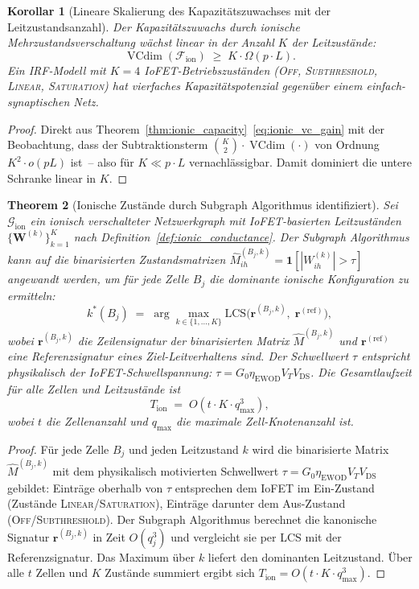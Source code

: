 \documentclass[12pt, a4paper, openany]{report}
\newtheorem{theorem}{Theorem}[chapter]
\newtheorem{corollary}[theorem]{Korollar}
\newcommand{\calG}{\mathcal{G}}
\newcommand{\calF}{\mathcal{F}}
\DeclareMathOperator{\VC}{VCdim}
\begin{document}
\begin{corollary}[Lineare Skalierung des Kapazitätszuwachses mit der Leitzustandsanzahl]
\label{cor:ionic_linear}
Der Kapazitätszuwachs durch ionische Mehrzustandsverschaltung wächst
linear in der Anzahl $K$ der Leitzustände:
\[
  \VC(\calF_{\mathrm{ion}}) \;\geq\; K \cdot \Omega(p \cdot L).
\]
Ein IRF-Modell mit $K = 4$ IoFET-Betriebszuständen
(\textsc{Off}, \textsc{Subthreshold}, \textsc{Linear}, \textsc{Saturation})
hat vierfaches Kapazitätspotenzial gegenüber einem einfach-synaptischen Netz.
\end{corollary}

\begin{proof}
Direkt aus Theorem~\ref{thm:ionic_capacity}~\eqref{eq:ionic_vc_gain} mit
der Beobachtung, dass der Subtraktionsterm $\binom{K}{2}\cdot\VC(\cdot)$
von Ordnung $K^2 \cdot o(pL)$ ist~-- also für $K \ll p\cdot L$ vernachlässigbar.
Damit dominiert die untere Schranke linear in $K$.
\end{proof}

\begin{theorem}[Ionische Zustände durch Subgraph Algorithmus identifiziert]
\label{thm:ionic_subgraph}
Sei $\calG_{\mathrm{ion}}$ ein ionisch verschalteter Netzwerkgraph mit
IoFET-basierten Leitzuständen $\{\bm{W}^{(k)}\}_{k=1}^K$ nach
Definition~\ref{def:ionic_conductance}.  Der Subgraph Algorithmus kann auf
die binarisierten Zustandsmatrizen
$\hat{M}^{(B_j,k)}_{ih} = \mathbf{1}[|W^{(k)}_{ih}| > \tau]$
angewandt werden, um für jede Zelle $B_j$ die \emph{dominante ionische
Konfiguration} zu ermitteln:
\begin{equation}
  \label{eq:ionic_dominant}
  k^*(B_j)
  \;=\; \arg\max_{k \in \{1,\ldots,K\}}
  \mathrm{LCS}\!\bigl(\bm{r}^{(B_j, k)},\; \bm{r}^{(\mathrm{ref})}\bigr),
\end{equation}
wobei $\bm{r}^{(B_j, k)}$ die Zeilensignatur der binarisierten Matrix
$\hat{M}^{(B_j,k)}$ und $\bm{r}^{(\mathrm{ref})}$ eine
Referenzsignatur eines Ziel-Leitverhaltens sind.
Der Schwellwert $\tau$ entspricht physikalisch der IoFET-Schwellspannung:
$\tau = G_0 \eta_{\mathrm{EWOD}} V_T V_{\mathrm{DS}}$.
Die Gesamtlaufzeit für alle Zellen und Leitzustände ist
\[
  T_{\mathrm{ion}} \;=\; O(t \cdot K \cdot q_{\max}^3),
\]
wobei $t$ die Zellenanzahl und $q_{\max}$ die maximale Zell-Knotenanzahl ist.
\end{theorem}

\begin{proof}
Für jede Zelle $B_j$ und jeden Leitzustand $k$ wird die binarisierte
Matrix $\hat{M}^{(B_j,k)}$ mit dem physikalisch motivierten Schwell\-wert
$\tau = G_0 \eta_{\mathrm{EWOD}} V_T V_\mathrm{DS}$ gebildet: Einträge
oberhalb von $\tau$ entsprechen dem IoFET im Ein-Zustand (Zustände
\textsc{Linear}/\textsc{Saturation}), Einträge darunter dem Aus-Zustand
(\textsc{Off}/\textsc{Subthreshold}).  Der Subgraph Algorithmus berechnet
die kanonische Signatur $\bm{r}^{(B_j, k)}$ in Zeit $O(q_j^3)$ und
vergleicht sie per LCS mit der Referenzsignatur.  Das Maximum über $k$
liefert den dominanten Leitzustand.  Über alle $t$ Zellen und $K$ Zustände
summiert ergibt sich $T_{\mathrm{ion}} = O(t \cdot K \cdot q_{\max}^3)$.
\end{proof}
\end{document}
